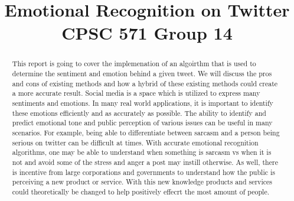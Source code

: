 \documentclass[conference]{IEEEtran}
\begin{document}
\title{Emotional Recognition on Twitter\\
{\footnotesize CPSC 571 Group 14}
}

\author{
\and
{}
\and
{}
}

\maketitle

\begin{abstract}
This report is going to cover the implemenation of an algoirthm that is used to determine the sentiment and emotion behind a given tweet.
We will discuss the pros and cons of existing methods and how a hybrid of these existing methods could create a more accurate result.
Social media is a space which is utilized to express many sentiments and emotions. 
In many real world applications, it is important to identify these emotions efficiently and as accurately as possible. 
The ability to identify and predict emotional tone and public perception of various issues can be useful in many scenarios. 
For example, being able to differentiate between sarcasm and a person being serious on twitter can be difficult at times. 
With accurate emotional recognition algorithms, one may be able to understand when something is sarcasm vs when it is not and avoid some of the stress and anger a post may instill otherwise. 
As well, there is incentive from large corporations and governments to understand how the public is perceiving a new product or service. 
With this new knowledge products and services could theoretically be changed to help positively effecrt the most amount of people. 

\end{abstract}
\end{document}

